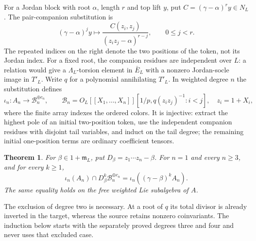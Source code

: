 \documentclass[11pt]{article}
\newtheorem{theorem}{Theorem}[section]
\theoremstyle{definition}\newtheorem{definition}[theorem]{Definition}
\begin{document}
For a Jordan block with root $\alpha$, length $r$ and
top lift $y$, put $C=(\gamma-\alpha)^ry\in N_L$.
The pair-companion substitution is
\[
 (\gamma-\alpha)^jy\longmapsto
       \frac{C(z_i,z_j)}{(z_iz_j-\alpha)^{r-j}},
                         \qquad0\leq j<r.
\]
The repeated indices on the right denote the two
positions of the token, not its Jordan index.
For a fixed root, the companion residues are
independent over $L$: a relation would give a
$\Lambda_L$-torsion element in $\bar E_L$ with a
nonzero Jordan-socle image in $T'_L$.
Write $q$ for a polynomial annihilating $T'_L$.
In weighted degree $n$ the substitution defines
\[
 \iota_n:A_n\longrightarrow\mathcal B_n^{\oplus c_n},
 \qquad
 \mathcal B_n=O_L[[X_1,\ldots,X_n]][1/p,
                      q(z_iz_j)^{-1}:i<j],\quad z_i=1+X_i,
\]
where the finite array indexes the ordered colors.
It is injective: extract the highest pole of an
initial two-position token, use the independent
companion residues with disjoint tail variables, and
induct on the tail degree; the remaining initial
one-position terms are ordinary coefficient tensors.

\begin{theorem}\label{thm:pair-total-saturation}
For $\beta\in1+\mathfrak m_L$, put
$D_\beta=z_1\cdots z_n-\beta$. For $n=1$ and every
$n\geq3$, and for every $k\geq1$,
\[
 \iota_n(A_n)\cap D_\beta^k\mathcal B_n^{\oplus c_n}
                   =\iota_n((\gamma-\beta)^kA_n).
\]
The same equality holds on the free weighted Lie
subalgebra of $A$.
\end{theorem}

The exclusion of degree two is necessary. At a root
of $q$ its total divisor is already inverted in the
target, whereas the source retains nonzero
coinvariants. The induction below starts with the
separately proved degrees three and four and never
uses that excluded case.
\end{document}
